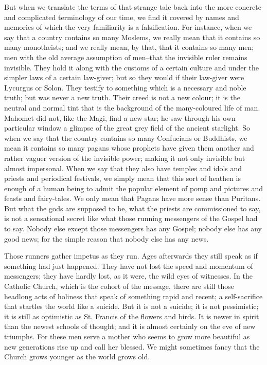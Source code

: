But when we translate the terms of that strange tale back into the more concrete and complicated terminology of our time, we find it covered by names and memories of which the very familiarity is a falsification. For instance, when we say that a country contains so many Moslems, we really mean that it contains so many monotheists; and we really mean, by that, that it contains so many men; men with the old average assumption of men--that the invisible ruler remains invisible. They hold it along with the customs of a certain culture and under the simpler laws of a certain law-giver; but so they would if their law-giver were Lycurgus or Solon. They testify to something which is a necessary and noble truth; but was never a new truth. Their creed is not a new colour; it is the neutral and normal tint that is the background of the many-coloured life of man. Mahomet did not, like the Magi, find a new star; he saw through his own particular window a glimpse of the great grey field of the ancient starlight. So when we say that the country contains so many Confucians or Buddhists, we mean it contains so many pagans whose prophets have given them another and rather vaguer version of the invisible power; making it not only invisible but almost impersonal. When we say that they also have temples and idols and priests and periodical festivals, we simply mean that this sort of heathen is enough of a human being to admit the popular element of pomp and pictures and feasts and fairy-tales. We only mean that Pagans have more sense than Puritans. But what the gods are supposed to be, what the priests are commissioned to say, is not a sensational secret like what those running messengers of the Gospel had to say. Nobody else except those messengers has any Gospel; nobody else has any good news; for the simple reason that nobody else has any news.

Those runners gather impetus as they run. Ages afterwards they still speak as if something had just happened. They have not lost the speed and momentum of messengers; they have hardly lost, as it were, the wild eyes of witnesses. In the Catholic Church, which is the cohort of the message, there are still those headlong acts of holiness that speak of something rapid and recent; a self-sacrifice that startles the world like a suicide. But it is not a suicide; it is not pessimistic; it is still as optimistic as St. Francis of the flowers and birds. It is newer in spirit than the newest schools of thought; and it is almost certainly on the eve of new triumphs. For these men serve a mother who seems to grow more beautiful as new generations rise up and call her blessed. We might sometimes fancy that the Church grows younger as the world grows old.

